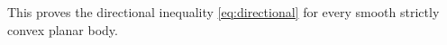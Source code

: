 \documentclass[final,12pt]{elsarticle}
\numberwithin{equation}{section}
\theoremstyle{remark}
\newcommand{\R}{\mathbb R}
\newcommand{\Gini}{\mathcal D}
\theoremstyle{definition}
\begin{document}










This proves the directional inequality \eqref{eq:directional} for every smooth strictly convex planar body.
\end{document}
